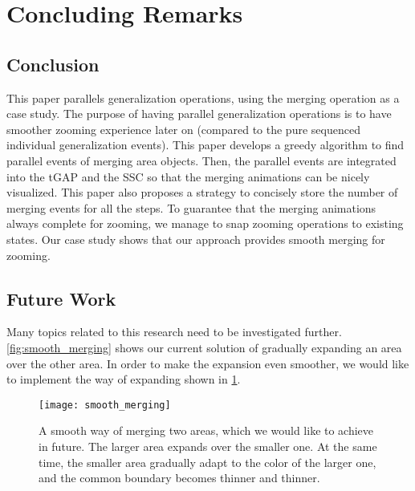 \documentclass[ijgi,article,submit,moreauthors,pdftex]{Definitions/mdpi}
\begin{document}






\section{Concluding Remarks}
\label{sec:concluding_remarks}

\subsection{Conclusion}
This paper parallels generalization operations,
using the merging operation as a case study. 
The purpose of having parallel generalization operations 
is to have smoother zooming experience later on 
(compared to the pure sequenced individual generalization events).
This paper develops a greedy algorithm to find parallel events of 
merging area objects.
Then, the parallel events are integrated into 
the tGAP and the SSC so that the merging animations can be nicely visualized.
This paper also proposes a strategy 
to concisely store the number of merging events for all the steps.
To guarantee that the merging animations always complete for zooming, 
we manage to snap zooming operations to existing states.
Our case study shows that 
our approach provides smooth merging for zooming.


\subsection{Future Work}

Many topics related to this research need to be investigated further.
\fig\ref{fig:smooth_merging} shows our current solution of
gradually expanding an area over the other area.
In order to make the expansion even smoother,
we would like to implement the way of expanding
shown in \fig\ref{fig:smooth_merging_future}.

\begin{figure}[tb]
\centering
\texttt{[image: smooth\_merging]}
\caption{A smooth way of merging two areas, 
    which we would like to achieve in future.
    The larger area expands over the smaller one.
    At the same time, 
    the smaller area gradually adapt to the color of the larger one,
    and the common boundary becomes thinner and thinner.}
\label{fig:smooth_merging_future}
\end{figure}
\end{document}
